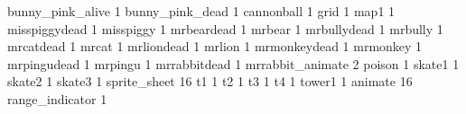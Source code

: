 bunny_pink_alive 1
bunny_pink_dead 1
cannonball 1
grid 1
map1 1
misspiggydead 1
misspiggy 1
mrbeardead 1
mrbear 1
mrbullydead 1
mrbully 1
mrcatdead 1
mrcat 1
mrliondead 1
mrlion 1
mrmonkeydead 1
mrmonkey 1
mrpingudead 1
mrpingu 1
mrrabbitdead 1
mrrabbit_animate 2
poison 1
skate1 1
skate2 1
skate3 1
sprite_sheet 16
t1 1
t2 1
t3 1
t4 1
tower1 1
animate 16
range_indicator 1

